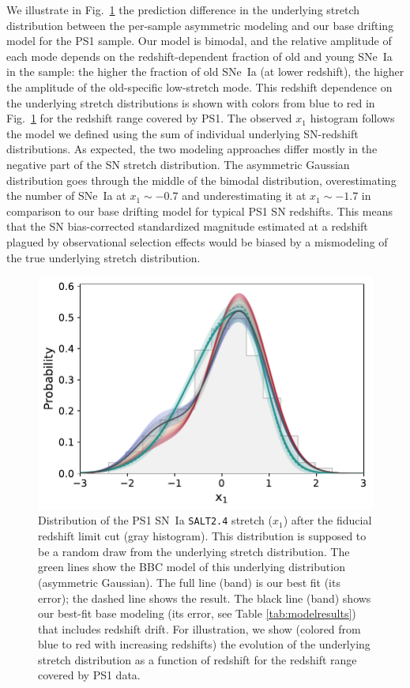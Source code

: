 \documentclass[]{aa}
\begin{document}
We illustrate in Fig.~\ref{fig:bbc_pdf_ps1} the prediction difference in the
underlying stretch distribution between the per-sample asymmetric modeling and
our base drifting model for the PS1 sample. Our model is bimodal, and the
relative amplitude of each mode depends on the redshift-dependent fraction of
old and young SNe~Ia in the sample: the higher the fraction of old SNe~Ia (at
lower redshift), the higher the amplitude of the old-specific low-stretch mode.
This redshift dependence on the underlying stretch distributions is
shown with colors from blue to red in Fig.~\ref{fig:bbc_pdf_ps1} for the
redshift range covered by PS1. The observed $x_1$ histogram follows the
model we defined using the sum of individual underlying SN-redshift
distributions. As expected, the two modeling approaches differ mostly in the
negative part of the SN stretch distribution. The asymmetric Gaussian
distribution goes through the middle of the bimodal distribution,
overestimating the number of SNe~Ia at $x_1\sim-0.7$ and underestimating it at
$x_1\sim-1.7$ in comparison to our base drifting model for typical PS1 SN
redshifts. This means that the SN bias-corrected standardized magnitude
estimated at a redshift plagued by observational
selection effects would be biased by a mismodeling of the true
underlying stretch distribution.

\begin{figure}
    \centering
    \includegraphics[width=\linewidth]{Article_figures/bbc_comp_PS1_hist-nr.pdf}
    \caption{Distribution of the PS1 SN~Ia \textsc{\texttt{SALT2.4}} stretch
        ($x_1$) after the fiducial redshift limit cut (gray histogram). This
        distribution is supposed to be a random draw from the underlying stretch
        distribution. The green lines show the BBC model of this underlying
        distribution (asymmetric Gaussian). The full line (band) is our best fit
        (its error); the dashed line shows the \cite{scolnic2018a} result. The
        black line (band) shows our best-fit base modeling (its error, see
        Table \ref{tab:modelresults}) that includes redshift drift. For
        illustration, we show (colored from blue to red with increasing
        redshifts) the evolution of the underlying stretch distribution as a
        function of redshift for the redshift range covered by PS1 data.}
    \label{fig:bbc_pdf_ps1}
\end{figure}
\end{document}
